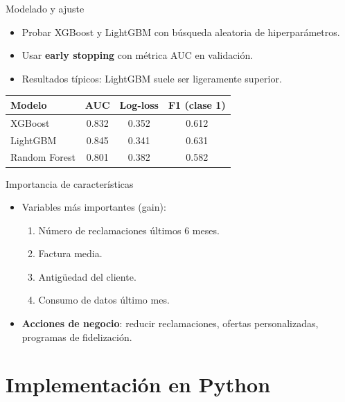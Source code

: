 \documentclass[aspectratio=169, 10pt, xcolor=table]{beamer}
\begin{document}
\begin{frame}{Modelado y ajuste}
    \begin{itemize}
        \item Probar XGBoost y LightGBM con búsqueda aleatoria de hiperparámetros.
        \item Usar \textbf{early stopping} con métrica AUC en validación.
        \item Resultados típicos: LightGBM suele ser ligeramente superior.
    \end{itemize}
    \begin{table}
        \centering
        \begin{tabular}{l|c|c|c}
            \toprule
            Modelo & AUC & Log-loss & F1 (clase 1) \\
            \midrule
            XGBoost & 0.832 & 0.352 & 0.612 \\
            LightGBM & 0.845 & 0.341 & 0.631 \\
            Random Forest & 0.801 & 0.382 & 0.582 \\
            \bottomrule
        \end{tabular}
    \end{table}
\end{frame}

\begin{frame}{Importancia de características}
    \begin{itemize}
        \item Variables más importantes (gain):
        \begin{enumerate}
            \item Número de reclamaciones últimos 6 meses.
            \item Factura media.
            \item Antigüedad del cliente.
            \item Consumo de datos último mes.
        \end{enumerate}
        \item \textbf{Acciones de negocio}: reducir reclamaciones, ofertas personalizadas, programas de fidelización.
    \end{itemize}
\end{frame}

\section{Implementación en Python}
\end{document}
